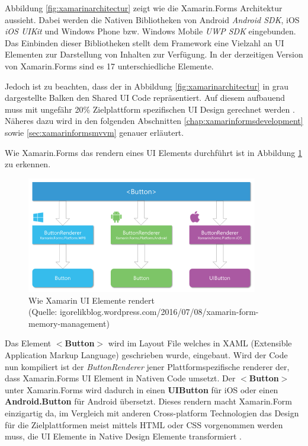 	Abbildung \ref{fig:xamarinarchitectur} zeigt wie die Xamarin.Forms Architektur aussieht. Dabei werden die Nativen Bibliotheken von Android \textit{Android SDK}, iOS \textit{iOS UIKit} und Windows Phone bzw. Windows Mobile \textit{UWP SDK} eingebunden. Das Einbinden dieser Bibliotheken stellt dem Framework eine Vielzahl an UI Elementen zur Darstellung von Inhalten zur Verfügung. In der derzeitigen Version von Xamarin.Forms sind es 17 unterschiedliche Elemente.

	Jedoch ist zu beachten, dass der in Abbildung \ref{fig:xamarinarchitectur} in grau dargestellte Balken den Shared UI Code repräsentiert. Auf diesem aufbauend muss mit ungefähr 20\% Zielplattform spezifischen UI Design gerechnet werden \cite{book:Xamarin-Mobile-Application-Development}. Näheres dazu wird in den folgenden Abschnitten \ref{chap:xamarinformsdevelopment} sowie \ref{sec:xamarinformsmvvm} genauer erläutert.

	Wie Xamarin.Forms das rendern eines UI Elements durchführt ist in Abbildung \ref{fig:xamarinaformsrender} zu erkennen.

	\begin{figure}[h!]
		\centering
		\includegraphics[width=0.9\textwidth]{images/xamarinforms-button-rendering.png}
		\caption[Wie Xamarin UI Elemente rendert]{Wie Xamarin UI Elemente rendert\\\hspace{\textwidth}(Quelle: igorelikblog.wordpress.com/2016/07/08/xamarin-form-memory-management)}
		\label{fig:xamarinaformsrender}
	\end{figure}

	Das Element \textbf{$<$Button$>$} wird im Layout File welches in XAML (Extensible Application Markup Language) geschrieben wurde, eingebaut. Wird der Code nun kompiliert ist der \textit{ButtonRenderer} jener Plattformspezifische renderer der, dass Xamarin.Forms UI Element in Nativen Code umsetzt. Der \textbf{$<$Button$>$} unter Xamarin.Forms wird dadurch in einen \textbf{UIButton} für iOS oder einen \textbf{Android.Button} für Android übersetzt. Dieses rendern macht Xamarin.Form einzigartig da, im Vergleich mit anderen Cross-platform Technologien das Design für die Zielplattformen meist mittels HTML oder CSS vorgenommen werden muss, die UI Elemente in Native Design Elemente transformiert \cite{book:Xamarin-Mobile-Application-Development}.

